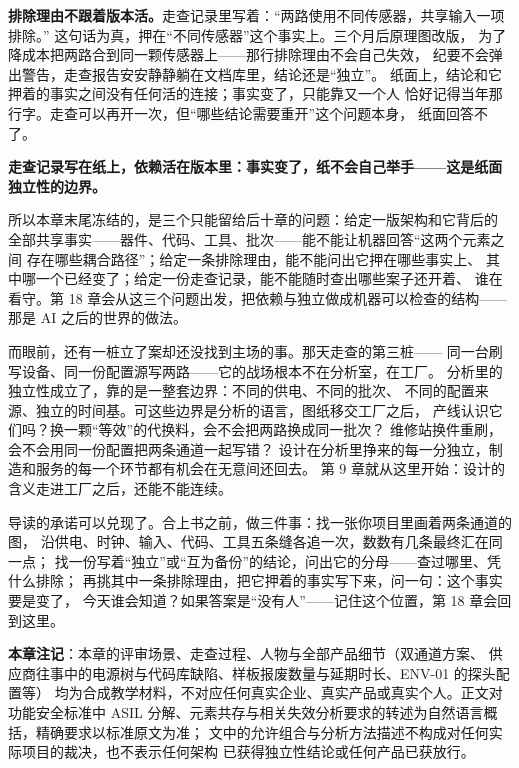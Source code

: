 \textbf{排除理由不跟着版本活。}走查记录里写着：“两路使用不同传感器，共享输入一项排除。”
这句话为真，押在“不同传感器”这个事实上。三个月后原理图改版，
为了降成本把两路合到同一颗传感器上——那行排除理由不会自己失效，
纪要不会弹出警告，走查报告安安静静躺在文档库里，结论还是“独立”。
纸面上，结论和它押着的事实之间没有任何活的连接；事实变了，只能靠又一个人
恰好记得当年那行字。走查可以再开一次，但“哪些结论需要重开”这个问题本身，
纸面回答不了。

\textbf{走查记录写在纸上，依赖活在版本里：事实变了，纸不会自己举手——这是纸面独立性的边界。}

所以本章末尾冻结的，是三个只能留给后十章的问题：给定一版架构和它背后的
全部共享事实——器件、代码、工具、批次——能不能让机器回答“这两个元素之间
存在哪些耦合路径”；给定一条排除理由，能不能问出它押在哪些事实上、
其中哪一个已经变了；给定一份走查记录，能不能随时查出哪些案子还开着、
谁在看守。第 18 章会从这三个问题出发，把依赖与独立做成机器可以检查的结构——
那是 AI 之后的世界的做法。

而眼前，还有一桩立了案却还没找到主场的事。那天走查的第三桩——
同一台刷写设备、同一份配置源写两路——它的战场根本不在分析室，在工厂。
分析里的独立性成立了，靠的是一整套边界：不同的供电、不同的批次、
不同的配置来源、独立的时间基。可这些边界是分析的语言，图纸移交工厂之后，
产线认识它们吗？换一颗“等效”的代换料，会不会把两路换成同一批次？
维修站换件重刷，会不会用同一份配置把两条通道一起写错？
设计在分析里挣来的每一分独立，制造和服务的每一个环节都有机会在无意间还回去。
第 9 章就从这里开始：设计的含义走进工厂之后，还能不能连续。

导读的承诺可以兑现了。合上书之前，做三件事：找一张你项目里画着两条通道的图，
沿供电、时钟、输入、代码、工具五条缝各追一次，数数有几条最终汇在同一点；
找一份写着“独立”或“互为备份”的结论，问出它的分母——查过哪里、凭什么排除；
再挑其中一条排除理由，把它押着的事实写下来，问一句：这个事实要是变了，
今天谁会知道？如果答案是“没有人”——记住这个位置，第 18 章会回到这里。


\begin{noteblock}
\textbf{本章注记}：本章的评审场景、走查过程、人物与全部产品细节（双通道方案、
供应商往事中的电源树与代码库缺陷、样板报废数量与延期时长、ENV-01 的探头配置等）
均为合成教学材料，不对应任何真实企业、真实产品或真实个人。正文对功能安全标准中
ASIL 分解、元素共存与相关失效分析要求的转述为自然语言概括，精确要求以标准原文为准；
文中的允许组合与分析方法描述不构成对任何实际项目的裁决，也不表示任何架构
已获得独立性结论或任何产品已获放行。
\end{noteblock}
